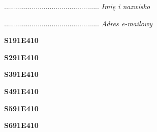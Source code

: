\begin{turn}{90}\begin{minipage}{\linewidth} \vspace{20mm} ................................................  \textit{Imię i nazwisko}\end{minipage}\end{turn}

\begin{turn}{90}\begin{minipage}{\linewidth} \vspace{20mm} ................................................  \textit{Adres e-mailowy}\end{minipage}\end{turn}

\begin{turn}{90}\huge \begin{minipage}{\linewidth} \vspace{10mm}\textbf{S191E410}\end{minipage}\end{turn}

\begin{turn}{90}\huge \begin{minipage}{\linewidth} \vspace{10mm}\textbf{S291E410}\end{minipage}\end{turn}

\begin{turn}{90}\huge \begin{minipage}{\linewidth} \vspace{10mm}\textbf{S391E410}\end{minipage}\end{turn}

\begin{turn}{90}\huge \begin{minipage}{\linewidth} \vspace{10mm}\textbf{S491E410}\end{minipage}\end{turn}

\begin{turn}{90}\huge \begin{minipage}{\linewidth} \vspace{10mm}\textbf{S591E410}\end{minipage}\end{turn}

\begin{turn}{90}\huge \begin{minipage}{\linewidth} \vspace{10mm}\textbf{S691E410}\end{minipage}\end{turn}

